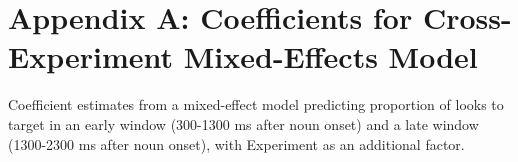 \documentclass[man]{apa2}
\begin{document}



\newpage
\theappendix 


\section{Appendix A: Coefficients for Cross-Experiment Mixed-Effects Model}
\label{app:coef}

\begin{table}
\label{tab:bothmodel}
\caption{Coefficient estimates from a mixed-effect model predicting proportion of looks to target in an early window (300-1300 ms after noun onset) and a late window (1300-2300 ms after noun onset), with Experiment as an additional factor.}


\end{table}
\end{document}
